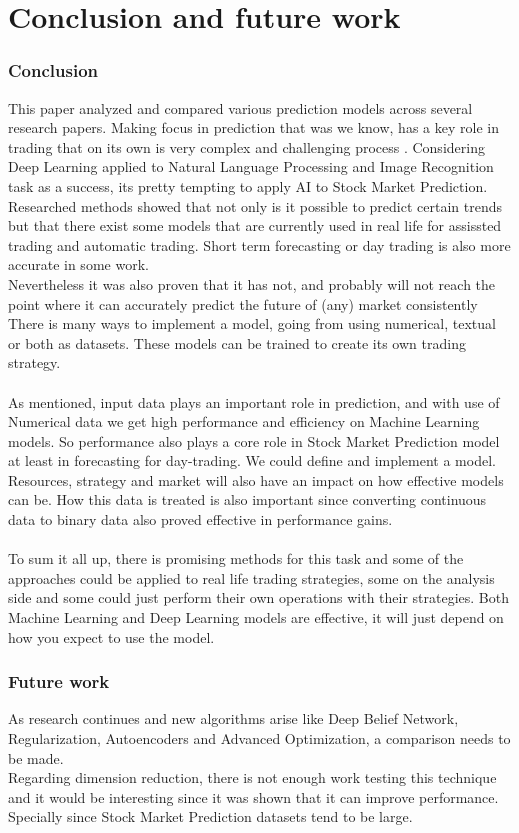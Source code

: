 \documentclass[conference]{IEEEtran}
\begin{document}
\section{Conclusion and future work}
\subsubsection*{Conclusion}
This paper analyzed and compared various prediction models across several research papers. Making focus in prediction that was we know, has a key role in trading that on its own is very complex and challenging process \cite{sharma2017survey}. Considering Deep Learning applied to Natural Language Processing and Image Recognition task as a success, its pretty tempting to apply AI to Stock Market Prediction. Researched methods showed that not only is it possible to predict certain trends but that there exist some models that are
currently used in real life for assissted trading and automatic trading. Short term forecasting or day trading is also more accurate in some work.
\\
Nevertheless it was also proven that it has not, and probably will not reach the point where it can accurately predict the future of (any) market consistently
There is many ways to implement a model, going from using numerical, textual or both as datasets. These models can be trained to create its own trading strategy.
\\\\
As mentioned, input data plays an important role in prediction, and with use of Numerical data we get high performance and efficiency on Machine Learning models. So performance also plays a core role in Stock Market Prediction model at least in forecasting for day-trading. We could define and implement a model. Resources, strategy and market will
also have an impact on how effective models can be. How this data is treated is also important since converting continuous data to binary data also proved effective in performance gains.
\\\\
To sum it all up, there is promising methods for this task and some of the approaches could be applied to real life trading strategies, some on the analysis side and some could just perform their own operations with their strategies. Both Machine Learning and Deep Learning models are effective, it will just depend on how you expect to use the model.
\subsubsection*{Future work}
As research continues and new algorithms arise like Deep Belief Network, Regularization, Autoencoders and Advanced Optimization, a comparison needs to be made.
\\
Regarding dimension reduction, there is not enough work testing this technique and it would be interesting since it was shown that it can improve performance. Specially since Stock Market Prediction datasets tend to be large.


\end{document}

